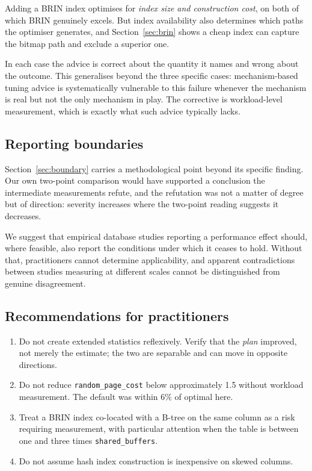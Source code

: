 \documentclass[preprint,12pt,authoryear]{elsarticle}
\newcommand{\rpc}{\texttt{random\_page\_cost}}
\newcommand{\sbuf}{\texttt{shared\_buffers}}
\begin{document}
Adding a BRIN index optimises for \emph{index size and construction
cost}, on both of which BRIN genuinely excels. But index availability
also determines which paths the optimiser generates, and
Section~\ref{sec:brin} shows a cheap index can capture the bitmap path
and exclude a superior one.

In each case the advice is correct about the quantity it names and
wrong about the outcome. This generalises beyond the three specific
cases: mechanism-based tuning advice is systematically vulnerable to
this failure whenever the mechanism is real but not the only mechanism
in play. The corrective is workload-level measurement, which is exactly
what such advice typically lacks.

\subsection{Reporting boundaries}

Section~\ref{sec:boundary} carries a methodological point beyond its
specific finding. Our own two-point comparison would have supported a
conclusion the intermediate measurements refute, and the refutation was
not a matter of degree but of direction: severity increases where the
two-point reading suggests it decreases.

We suggest that empirical database studies reporting a performance
effect should, where feasible, also report the conditions under which
it ceases to hold. Without that, practitioners cannot determine
applicability, and apparent contradictions between studies measuring at
different scales cannot be distinguished from genuine disagreement.

\subsection{Recommendations for practitioners}

\begin{enumerate}
\item Do not create extended statistics reflexively. Verify that the
  \emph{plan} improved, not merely the estimate; the two are separable
  and can move in opposite directions.
\item Do not reduce \rpc{} below approximately 1.5 without workload
  measurement. The default was within 6\% of optimal here.
\item Treat a BRIN index co-located with a B-tree on the same column as
  a risk requiring measurement, with particular attention when the
  table is between one and three times \sbuf{}.
\item Do not assume hash index construction is inexpensive on skewed
  columns.
\end{enumerate}
\end{document}
